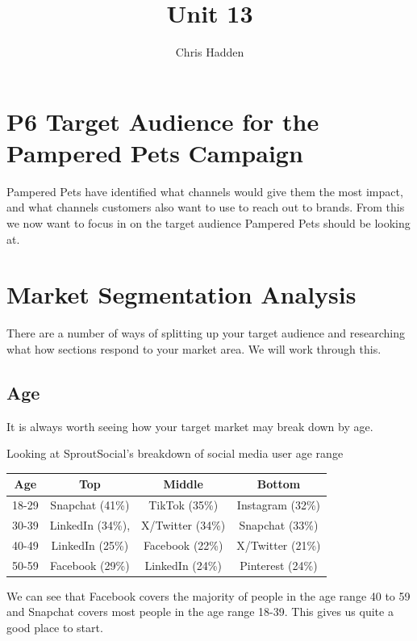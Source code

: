 \documentclass{article}
\begin{document}
\title{Unit 13}
\author{Chris Hadden}
\date{}
\maketitle

\section{P6 Target Audience for the Pampered Pets Campaign}
Pampered Pets have identified what channels would give them the most impact, and what channels customers also want to use to reach out to brands. From this we now want to focus in on the target audience Pampered Pets should be looking at.

\section{Market Segmentation Analysis}
There are a number of ways of splitting up your target audience and researching what how sections respond to your market area. We will work through this.

\subsection{Age}
It is always worth seeing how your target market may break down by age. 

Looking at SproutSocial's breakdown of social media user age range \cite{sproutage}
\begin{center}
    \begin{tabular}{||c c c c||} 
     \hline
     Age & Top & Middle & Bottom \\ [0.5ex] 
     \hline\hline
     18-29 & Snapchat (41\%) & TikTok (35\%) & Instagram (32\%) \\ 
     \hline
     30-39 & LinkedIn (34\%), & X/Twitter (34\%) & Snapchat (33\%) \\
     \hline
     40-49 & LinkedIn (25\%) & Facebook (22\%) & X/Twitter (21\%) \\
     \hline
     50-59 & Facebook (29\%) & LinkedIn (24\%) & Pinterest (24\%) \\
     \hline
    \end{tabular}
    \label {Age ranges of social media}
    \end{center}

We can see that Facebook covers the majority of people in the age range 40 to 59 and Snapchat covers most people in the age range 18-39. This gives us quite a good place to start.
\end{document}
